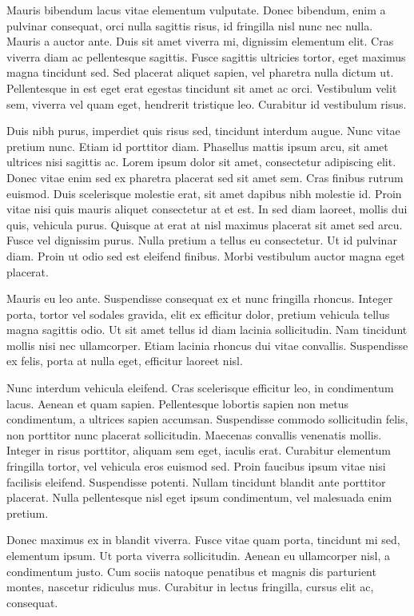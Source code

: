 \documentclass[aps,11pt, twocolumn]{revtex4-1}
\begin{document}
Mauris bibendum lacus vitae elementum vulputate. Donec bibendum, enim a pulvinar consequat, orci nulla sagittis risus, id fringilla nisl nunc nec nulla. Mauris a auctor ante. Duis sit amet viverra mi, dignissim elementum elit. Cras viverra diam ac pellentesque sagittis. Fusce sagittis ultricies tortor, eget maximus magna tincidunt sed. Sed placerat aliquet sapien, vel pharetra nulla dictum ut. Pellentesque in est eget erat egestas tincidunt sit amet ac orci. Vestibulum velit sem, viverra vel quam eget, hendrerit tristique leo. Curabitur id vestibulum risus.

Duis nibh purus, imperdiet quis risus sed, tincidunt interdum augue. Nunc vitae pretium nunc. Etiam id porttitor diam. Phasellus mattis ipsum arcu, sit amet ultrices nisi sagittis ac. Lorem ipsum dolor sit amet, consectetur adipiscing elit. Donec vitae enim sed ex pharetra placerat sed sit amet sem. Cras finibus rutrum euismod. Duis scelerisque molestie erat, sit amet dapibus nibh molestie id. Proin vitae nisi quis mauris aliquet consectetur at et est. In sed diam laoreet, mollis dui quis, vehicula purus. Quisque at erat at nisl maximus placerat sit amet sed arcu. Fusce vel dignissim purus. Nulla pretium a tellus eu consectetur. Ut id pulvinar diam. Proin ut odio sed est eleifend finibus. Morbi vestibulum auctor magna eget placerat.

Mauris eu leo ante. Suspendisse consequat ex et nunc fringilla rhoncus. Integer porta, tortor vel sodales gravida, elit ex efficitur dolor, pretium vehicula tellus magna sagittis odio. Ut sit amet tellus id diam lacinia sollicitudin. Nam tincidunt mollis nisi nec ullamcorper. Etiam lacinia rhoncus dui vitae convallis. Suspendisse ex felis, porta at nulla eget, efficitur laoreet nisl.

Nunc interdum vehicula eleifend. Cras scelerisque efficitur leo, in condimentum lacus. Aenean et quam sapien. Pellentesque lobortis sapien non metus condimentum, a ultrices sapien accumsan. Suspendisse commodo sollicitudin felis, non porttitor nunc placerat sollicitudin. Maecenas convallis venenatis mollis. Integer in risus porttitor, aliquam sem eget, iaculis erat. Curabitur elementum fringilla tortor, vel vehicula eros euismod sed. Proin faucibus ipsum vitae nisi facilisis eleifend. Suspendisse potenti. Nullam tincidunt blandit ante porttitor placerat. Nulla pellentesque nisl eget ipsum condimentum, vel malesuada enim pretium.

Donec maximus ex in blandit viverra. Fusce vitae quam porta, tincidunt mi sed, elementum ipsum. Ut porta viverra sollicitudin. Aenean eu ullamcorper nisl, a condimentum justo. Cum sociis natoque penatibus et magnis dis parturient montes, nascetur ridiculus mus. Curabitur in lectus fringilla, cursus elit ac, consequat.
\end{document}
